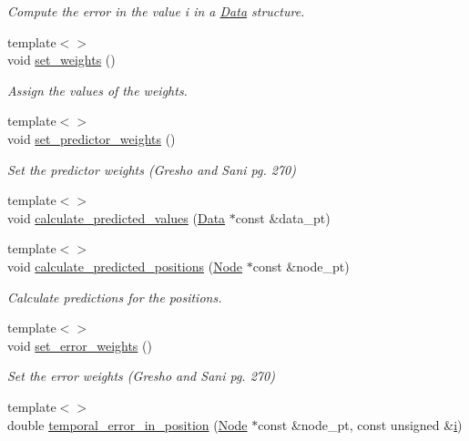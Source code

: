 \begin{DoxyCompactItemize}
\begin{DoxyCompactList}\small\item\em Compute the error in the value i in a \hyperlink{classoomph_1_1Data}{Data} structure. \end{DoxyCompactList}\item 
{\footnotesize template$<$$>$ }\\void \hyperlink{classoomph_1_1BDF_aacecf959d3e27e8f361764b43e4c1612}{set\+\_\+weights} ()
\begin{DoxyCompactList}\small\item\em Assign the values of the weights. \end{DoxyCompactList}\item 
{\footnotesize template$<$$>$ }\\void \hyperlink{classoomph_1_1BDF_ac568d7f427667cf6a80b772aa3431980}{set\+\_\+predictor\+\_\+weights} ()
\begin{DoxyCompactList}\small\item\em Set the predictor weights (Gresho and Sani pg. 270) \end{DoxyCompactList}\item 
{\footnotesize template$<$$>$ }\\void \hyperlink{classoomph_1_1BDF_a45086cba429e3a8d8b092e4ebe5b82b2}{calculate\+\_\+predicted\+\_\+values} (\hyperlink{classoomph_1_1Data}{Data} $\ast$const \&data\+\_\+pt)
\item 
{\footnotesize template$<$$>$ }\\void \hyperlink{classoomph_1_1BDF_a60f640c138a3e63c35888bedc68c4e5d}{calculate\+\_\+predicted\+\_\+positions} (\hyperlink{classoomph_1_1Node}{Node} $\ast$const \&node\+\_\+pt)
\begin{DoxyCompactList}\small\item\em Calculate predictions for the positions. \end{DoxyCompactList}\item 
{\footnotesize template$<$$>$ }\\void \hyperlink{classoomph_1_1BDF_a298a3ba0ce469359190a3d9ceeeb3652}{set\+\_\+error\+\_\+weights} ()
\begin{DoxyCompactList}\small\item\em Set the error weights (Gresho and Sani pg. 270) \end{DoxyCompactList}\item 
{\footnotesize template$<$$>$ }\\double \hyperlink{classoomph_1_1BDF_a77259e610f40a996c4e8d6151078ce94}{temporal\+\_\+error\+\_\+in\+\_\+position} (\hyperlink{classoomph_1_1Node}{Node} $\ast$const \&node\+\_\+pt, const unsigned \&\hyperlink{cfortran_8h_adb50e893b86b3e55e751a42eab3cba82}{i})

\end{DoxyCompactItemize}
